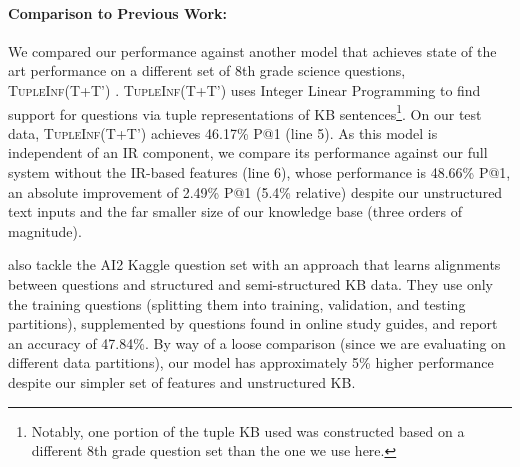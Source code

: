 \paragraph{Comparison to Previous Work:}
We compared our performance against another model that achieves state of the art performance on a different set of 8th grade science questions, \textsc{TupleInf}(T+T') \citep{khot2017tupleinf}.  \textsc{TupleInf}(T+T') uses Integer Linear Programming to find support for questions via tuple representations of KB sentences\footnote{Notably, one portion of the tuple KB used was constructed based on a different 8th grade question set than the one we use here.}.
On our test data, \textsc{TupleInf}(T+T') achieves 46.17\% P@1 (line 5). 
As this model is independent of an IR component, we compare its performance against our full system without the IR-based features (line 6), whose performance is 48.66\% P@1, an absolute improvement of 2.49\% P@1 (5.4\% relative) despite our unstructured text inputs and the far smaller size of our knowledge base (three orders of magnitude). 


\citet{sachan2016science} also tackle the AI2 Kaggle question set with an approach  that learns alignments between questions and structured and semi-structured KB data.
They use only the training questions (splitting them into training, validation, and testing partitions), supplemented by questions found in online study guides, and report an accuracy of 47.84\%.  By way of a loose comparison (since we are evaluating on different data partitions), our model has approximately 5\% higher performance despite our simpler set of features and unstructured KB.  

